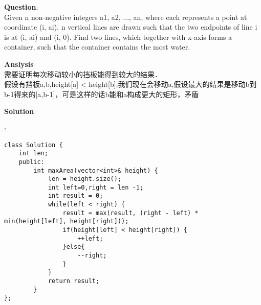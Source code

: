     
\begin{description}
    \item{\textbf{Question}}:\\%
		Given n non-negative integers a1, a2, ..., an, where each represents a point at coordinate (i, ai). n vertical lines are drawn such that the two endpoints of line i is at (i, ai) and (i, 0). Find two lines, which together with x-axis forms a container, such that the container contains the most water.\\

    \item{\textbf{Anslysis}}\\
		需要证明每次移动较小的挡板能得到较大的结果．\\
		假设有挡板a,b,height[a] < height[b],我们现在会移动a,假设最大的结果是移动b到b-1得来的[a,b-1]，可是这样的话b能和a构成更大的矩形，矛盾\\

    \item{\textbf{Solution}}\\
	\item{} : \\
		\begin{lstlisting}
class Solution {
	int len;
	public:
		int maxArea(vector<int>& height) {
			len = height.size();
			int left=0,right = len -1;
			int result = 0;
			while(left < right) {
				result = max(result, (right - left) * min(height[left], height[right]));
				if(height[left] < height[right]) {
					++left;
				}else{
					--right;
				}
			}
			return result;
		}
};		\end{lstlisting}

\end{description}

